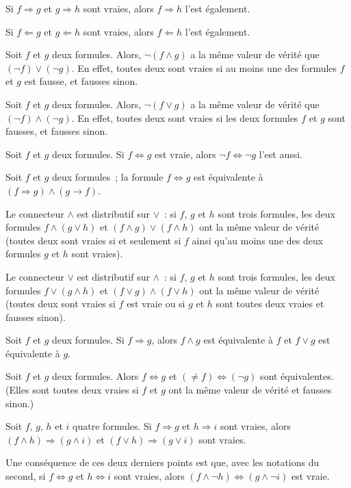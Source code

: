           \item Si $f \Rightarrow g$ et $g \Rightarrow h$ sont vraies, alors $f \Rightarrow h$ l'est également. 
          \item Si $f \Leftarrow g$ et $g \Leftarrow h$ sont vraies, alors $f \Leftarrow h$ l'est également. 
      \stopitemize
  \item Soit $f$ et $g$ deux formules. Alors, $\lnot (f \wedge g)$ a la même valeur de vérité que $(\lnot f) \vee (\lnot g)$. 
      En effet, toutes deux sont vraies si au moins une des formules $f$ et $g$ est fausse, et fausses sinon.
  \item Soit $f$ et $g$ deux formules. Alors, $\lnot (f \vee g)$ a la même valeur de vérité que $(\lnot f) \wedge (\lnot g)$. 
      En effet, toutes deux sont vraies si les deux formules $f$ et $g$ sont fausses, et fausses sinon.
  \item Soit $f$ et $g$ deux formules. Si $f \Leftrightarrow g$ est vraie, alors $\lnot f \Leftrightarrow \lnot g$ l'est aussi.
  \item Soit $f$ et $g$ deux formules ; la formule $f \Leftrightarrow g$ est équivalente à $(f \Rightarrow g) \wedge (g \rightarrow f)$. 
  \item Le connecteur $\wedge$ est distributif sur $\vee$ : si $f$, $g$ et $h$ sont trois formules, les deux formules $f \wedge (g \vee h)$ et $(f \wedge g) \vee (f \wedge h)$ ont la même valeur de vérité (toutes deux sont vraies si et seulement si $f$ ainsi qu'au moins une des deux formules $g$ et $h$ sont vraies). 
  \item Le connecteur $\vee$ est distributif sur $\wedge$ : si $f$, $g$ et $h$ sont trois formules, les deux formules $f \vee (g \wedge h)$ et $(f \vee g) \wedge (f \vee h)$ ont la même valeur de vérité (toutes deux sont vraies si $f$ est vraie ou si $g$ et $h$ sont toutes deux vraies et fausses sinon).
  \item Soit $f$ et $g$ deux formules. Si $f \Rightarrow g$, alors $f \wedge g$ est équivalente à $f$ et $f \vee g$ est équivalente à $g$.
  \item Soit $f$ et $g$ deux formules. Alors $f \Leftrightarrow g$ et $(\neq f) \Leftrightarrow (\lnot g)$ sont équivalentes. 
      (Elles sont toutes deux vraies si $f$ et $g$ ont la même valeur de vérité et fausses sinon.)
  \item Soit $f$, $g$, $h$ et $i$ quatre formules. 
      Si $f \Rightarrow g$ et $h \Rightarrow i$ sont vraies, alors $(f \wedge h) \Rightarrow (g \wedge i)$ et $(f \vee h) \Rightarrow (g \vee i)$ sont vraies.
  \item Une conséquence de ces deux derniers points est que, avec les notations du second, si $f \Leftrightarrow g$ et $h \Leftrightarrow i$ sont vraies, alors $(f \wedge \lnot h) \Leftrightarrow (g \wedge \lnot i)$ est vraie.
\stopitemize

